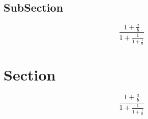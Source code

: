 \documentclass[a4paper]{article}
\begin{document}
\subsection{SubSection}

\[ \frac{1+\frac{a}{b}}{1+\frac{1}{1+\frac{1}{a}}} \]

\section{Section}

\[ \frac{1+\frac{a}{b}}{1+\frac{1}{1+\frac{1}{a}}} \]
\end{document}
